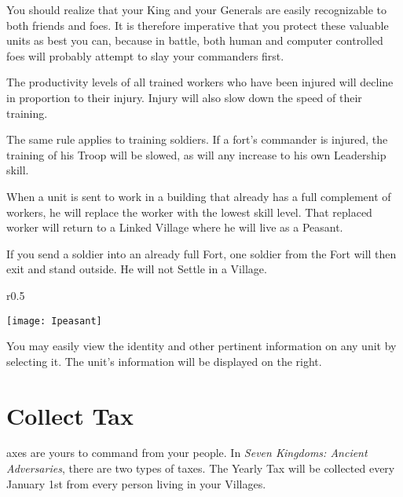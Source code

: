 
You should realize that your King and your Generals are easily recognizable to both friends and foes. It is therefore imperative that you protect these valuable units as best you can, because in battle, both human and computer controlled foes will probably attempt to slay your commanders first.

The productivity levels of all trained workers who have been injured will decline in proportion to their injury. Injury will also slow down the speed of their training.


The same rule applies to training soldiers. If a fort’s commander is injured, the training of his Troop will be slowed, as will any increase to his own Leadership skill.

When a unit is sent to work in a building that already has a full complement of workers, he will replace the worker with the lowest skill level. That replaced worker will return to a Linked Village where he will live as a Peasant.

If you send a soldier into an already full Fort, one soldier from the Fort will then exit and stand outside. He will not Settle in a Village.

\begin{wrapfigure}{r}{0.5\textwidth}
    \vspace{-20pt}
    \begin{center}
        \texttt{[image: Ipeasant]} %
    \end{center}
    \vspace{-20pt}
\end{wrapfigure}

You may easily view the identity and other pertinent information on any unit by selecting it. The unit’s information will be displayed on the right. \\ %

\section{\textsf{Collect Tax}}


axes are yours to command from your people. In \textit{Seven Kingdoms: Ancient Adversaries}, there are two types of taxes. The Yearly Tax will be collected every January 1st from every person living in your Villages.

